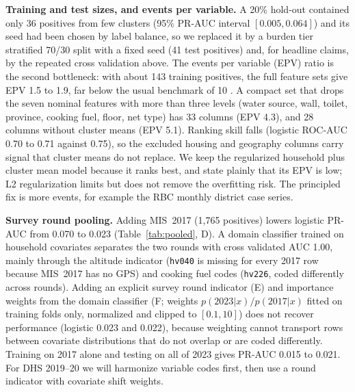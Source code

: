 \documentclass[11pt]{article}
\begin{document}
\textbf{Training and test sizes, and events per variable.} A 20\% hold-out contained only 36 positives from few clusters (95\% PR-AUC interval $[0.005,0.064]$) and its seed had been chosen by label balance, so we replaced it by a burden tier stratified 70/30 split with a fixed seed (41 test positives) and, for headline claims, by the repeated cross validation above. The events per variable (EPV) ratio is the second bottleneck: with about 143 training positives, the full feature sets give EPV 1.5 to 1.9, far below the usual benchmark of 10 \cite{peduzzi1996}. A compact set that drops the seven nominal features with more than three levels (water source, wall, toilet, province, cooking fuel, floor, net type) has 33 columns (EPV 4.3), and 28 columns without cluster means (EPV 5.1). Ranking skill falls (logistic ROC-AUC 0.70 to 0.71 against 0.75), so the excluded housing and geography columns carry signal that cluster means do not replace. We keep the regularized household plus cluster mean model because it ranks best, and state plainly that its EPV is low; L2 regularization limits but does not remove the overfitting risk. The principled fix is more events, for example the RBC monthly district case series.

\textbf{Survey round pooling.} Adding MIS~2017 (1{,}765 positives) lowers logistic PR-AUC from 0.070 to 0.023 (Table~\ref{tab:pooled}, D). A domain classifier trained on household covariates separates the two rounds with cross validated AUC 1.00, mainly through the altitude indicator (\texttt{hv040} is missing for every 2017 row because MIS~2017 has no GPS) and cooking fuel codes (\texttt{hv226}, coded differently across rounds). Adding an explicit survey round indicator (E) and importance weights from the domain classifier (F; weights $p(2023|x)/p(2017|x)$ fitted on training folds only, normalized and clipped to $[0.1,10]$) does not recover performance (logistic 0.023 and 0.022), because weighting cannot transport rows between covariate distributions that do not overlap or are coded differently. Training on 2017 alone and testing on all of 2023 gives PR-AUC 0.015 to 0.021. For DHS 2019--20 we will harmonize variable codes first, then use a round indicator with covariate shift weights.
\end{document}
